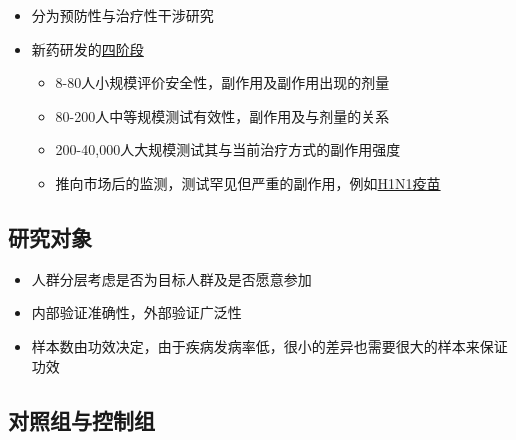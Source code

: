 \documentclass[]{book}
\providecommand{\tightlist}{%
  \setlength{\itemsep}{0pt}\setlength{\parskip}{0pt}}
\begin{document}
\begin{itemize}
\tightlist
\item
  分为预防性与治疗性干涉研究
\item
  新药研发的\href{https://clinicaltrials.gov/ct2/info/glossary\#phasel}{四阶段}

  \begin{itemize}
  \tightlist
  \item
    8-80人小规模评价安全性，副作用及副作用出现的剂量
  \item
    80-200人中等规模测试有效性，副作用及与剂量的关系
  \item
    200-40,000人大规模测试其与当前治疗方式的副作用强度
  \item
    推向市场后的监测，测试罕见但严重的副作用，例如\href{http://sphweb.bumc.bu.edu/otlt/MPH-Modules/EP/EP713_ClinicalTrials/H1N1_Surveillance.pdf}{H1N1疫苗}
  \end{itemize}
\end{itemize}

\hypertarget{ux7814ux7a76ux5bf9ux8c61}{%
\subsection{研究对象}\label{ux7814ux7a76ux5bf9ux8c61}}

\begin{itemize}
\tightlist
\item
  人群分层考虑是否为目标人群及是否愿意参加
\item
  内部验证准确性，外部验证广泛性
\item
  样本数由功效决定，由于疾病发病率低，很小的差异也需要很大的样本来保证功效
\end{itemize}

\hypertarget{ux5bf9ux7167ux7ec4ux4e0eux63a7ux5236ux7ec4}{%
\subsection{对照组与控制组}\label{ux5bf9ux7167ux7ec4ux4e0eux63a7ux5236ux7ec4}}
\end{document}
